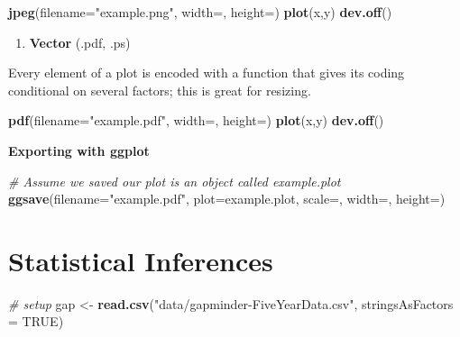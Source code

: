 \documentclass[]{book}
\newenvironment{Shaded}{\begin{snugshade}}{\end{snugshade}}
\newcommand{\KeywordTok}[1]{\textcolor[rgb]{0.13,0.29,0.53}{\textbf{#1}}}
\newcommand{\DataTypeTok}[1]{\textcolor[rgb]{0.13,0.29,0.53}{#1}}
\newcommand{\StringTok}[1]{\textcolor[rgb]{0.31,0.60,0.02}{#1}}
\newcommand{\CommentTok}[1]{\textcolor[rgb]{0.56,0.35,0.01}{\textit{#1}}}
\newcommand{\OtherTok}[1]{\textcolor[rgb]{0.56,0.35,0.01}{#1}}
\newcommand{\NormalTok}[1]{#1}
\providecommand{\tightlist}{%
  \setlength{\itemsep}{0pt}\setlength{\parskip}{0pt}}
\begin{document}
\begin{Shaded}
\begin{Highlighting}[]
\KeywordTok{jpeg}\NormalTok{(}\DataTypeTok{filename=}\StringTok{"example.png"}\NormalTok{, }\DataTypeTok{width=}\NormalTok{, }\DataTypeTok{height=}\NormalTok{)}
\KeywordTok{plot}\NormalTok{(x,y)}
\KeywordTok{dev.off}\NormalTok{()}
\end{Highlighting}
\end{Shaded}

\begin{enumerate}
\def\labelenumi{\arabic{enumi})}
\setcounter{enumi}{1}
\tightlist
\item
  \textbf{Vector} (.pdf, .ps)
\end{enumerate}

Every element of a plot is encoded with a function that gives its coding
conditional on several factors; this is great for resizing.

\begin{Shaded}
\begin{Highlighting}[]
\KeywordTok{pdf}\NormalTok{(}\DataTypeTok{filename=}\StringTok{"example.pdf"}\NormalTok{, }\DataTypeTok{width=}\NormalTok{, }\DataTypeTok{height=}\NormalTok{)}
\KeywordTok{plot}\NormalTok{(x,y)}
\KeywordTok{dev.off}\NormalTok{()}
\end{Highlighting}
\end{Shaded}

\textbf{Exporting with ggplot}

\begin{Shaded}
\begin{Highlighting}[]
\CommentTok{# Assume we saved our plot is an object called example.plot}
\KeywordTok{ggsave}\NormalTok{(}\DataTypeTok{filename=}\StringTok{"example.pdf"}\NormalTok{, }\DataTypeTok{plot=}\NormalTok{example.plot, }\DataTypeTok{scale=}\NormalTok{, }\DataTypeTok{width=}\NormalTok{, }\DataTypeTok{height=}\NormalTok{)}
\end{Highlighting}
\end{Shaded}

\chapter{Statistical Inferences}\label{statistical-inferences}

\begin{Shaded}
\begin{Highlighting}[]
\CommentTok{# setup}
\NormalTok{gap <-}\StringTok{ }\KeywordTok{read.csv}\NormalTok{(}\StringTok{"data/gapminder-FiveYearData.csv"}\NormalTok{, }\DataTypeTok{stringsAsFactors =} \OtherTok{TRUE}\NormalTok{)}
\end{Highlighting}
\end{Shaded}
\end{document}
